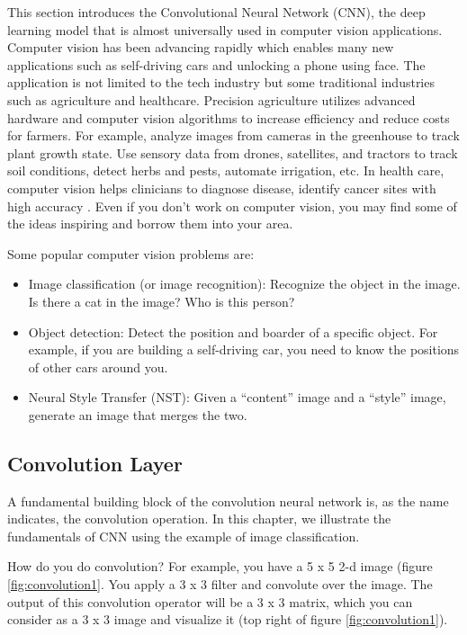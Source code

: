 \documentclass[12pt,]{krantz}
\providecommand{\tightlist}{%
  \setlength{\itemsep}{0pt}\setlength{\parskip}{0pt}}
\begin{document}
This section introduces the Convolutional Neural Network (CNN), the deep learning model that is almost universally used in computer vision applications. Computer vision has been advancing rapidly which enables many new applications such as self-driving cars and unlocking a phone using face. The application is not limited to the tech industry but some traditional industries such as agriculture and healthcare. Precision agriculture utilizes advanced hardware and computer vision algorithms to increase efficiency and reduce costs for farmers. For example, analyze images from cameras in the greenhouse to track plant growth state. Use sensory data from drones, satellites, and tractors to track soil conditions, detect herbs and pests, automate irrigation, etc. In health care, computer vision helps clinicians to diagnose disease, identify cancer sites with high accuracy \citep{gloria2019}. Even if you don't work on computer vision, you may find some of the ideas inspiring and borrow them into your area.

Some popular computer vision problems are:

\begin{itemize}
\tightlist
\item
  Image classification (or image recognition): Recognize the object in the image. Is there a cat in the image? Who is this person?
\item
  Object detection: Detect the position and boarder of a specific object. For example, if you are building a self-driving car, you need to know the positions of other cars around you.
\item
  Neural Style Transfer (NST): Given a ``content'' image and a ``style'' image, generate an image that merges the two.
\end{itemize}

\hypertarget{convolution-layer}{%
\subsection{Convolution Layer}\label{convolution-layer}}

A fundamental building block of the convolution neural network is, as the name indicates, the convolution operation. In this chapter, we illustrate the fundamentals of CNN using the example of image classification.

How do you do convolution? For example, you have a 5 x 5 2-d image (figure \ref{fig:convolution1}. You apply a 3 x 3 filter and convolute over the image. The output of this convolution operator will be a 3 x 3 matrix, which you can consider as a 3 x 3 image and visualize it (top right of figure \ref{fig:convolution1}).
\end{document}
